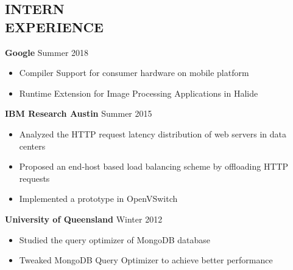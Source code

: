 \documentclass[margin, 9pt]{res} %
\begin{document}
\begin{resume}

\section{INTERN\\ EXPERIENCE}

{\textbf{Google}} \hfill{Summer 2018}\\
\vspace*{-10pt}
\begin{itemize}[leftmargin=*] \itemsep -3pt
\vspace*{-5pt}
	\item Compiler Support for consumer hardware on mobile platform
  \item Runtime Extension for Image Processing Applications in Halide
\end{itemize} 

\medskip
{\textbf{IBM Research Austin}} \hfill{Summer 2015}\\
\vspace*{-10pt}
\begin{itemize}[leftmargin=*] \itemsep -3pt
\vspace*{-5pt}
	\item Analyzed the HTTP request latency distribution of web servers in data centers
	\item Proposed an end-host based load balancing scheme by offloading HTTP requests
	\item Implemented a prototype in OpenVSwitch
\end{itemize}

\medskip
{\textbf{University of Queensland}} \hfill{Winter 2012}\\
\vspace*{-10pt}
\begin{itemize}[leftmargin=*] \itemsep -3pt
\vspace*{-5pt}
	\item Studied the query optimizer of MongoDB database
	\item Tweaked MongoDB Query Optimizer to achieve better performance 
\end{itemize}

 

\end{resume}
\end{document}
